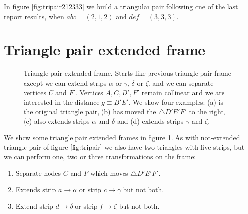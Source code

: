 \documentclass[11pt]{article}
\begin{document}
In figure \ref{fig:tripair212333} we build a triangular pair following one of the last report results, when $abc=(2,1,2)$ and $def=(3,3,3)$.


\section{Triangle pair extended frame}

\begin{figure}[H]
 \centering
 \caption{Triangle pair extended frame. Starts like previous triangle pair frame except
 we can extend strips $\alpha$ or $\gamma$, $\delta$ or $\zeta$, and we can separate vertices $C$ and $F'$.
 Vertices $A,C,D',F'$ remain collinear and we are interested in the distance $g \equiv \overline{B'E'}$. We show four examples: (a) is the original triangle pair,
 (b) has moved the $\triangle{D'E'F'}$ to the right,
 (c) also extends strips $\alpha$ and $\delta$ and (d) extends strips $\gamma$ and $\zeta$.
 }
 \label{fig:tripairext}
\end{figure}

We show some triangle pair extended frames in figure \ref{fig:tripairext}.
As with not-extended triangle pair of figure \ref{fig:tripair} we also have two triangles with five strips, but we can perform one, two or three transformations on the frame: 
\begin{enumerate}
 \item Separate nodes $C$ and $F$ which moves $\triangle{D'E'F'}$.
 \item Extends strip $a \rightarrow \alpha$ or strip $c \rightarrow \gamma$ but not both.
 \item Extend strip $d \rightarrow \delta$ or strip $f \rightarrow \zeta$ but not both.
\end{enumerate}
\end{document}
